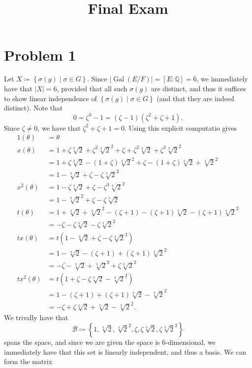 \documentclass[11pt, letterpaper]{article}
\title{Final Exam}
\begin{document}
\makeproblem
\section*{Problem 1}
Let $X\coloneqq \left\{ \sigma (g)\mid \sigma \in G \right\} $. Since $\left| \operatorname{Gal} (E/F) \right| =\left[ E:\mathbb{Q}  \right]=6 $, we immediately have that $\left| X  \right| = 6$, provided that all such $\sigma (g)$ are distinct, and thus it suffices to show linear independence of $\left\{ \sigma (g)\mid \sigma \in G \right\} $ (and that they are indeed distinct). Note that
\[
	0=\zeta ^3-1=(\zeta -1)(\zeta ^2+\zeta +1)
.\]
Since $\zeta \neq 0$, we have that $\zeta ^2+\zeta +1=0$. Using this explicit computatio gives
\begin{align*}
	1(\theta )&=\theta \\
	x(\theta )&=1+\zeta \sqrt[3]{2} +\zeta ^2\sqrt[3]{2}^2 +\zeta +\zeta ^2\sqrt[3]{2} +\zeta ^3\sqrt[3]{2} ^2\\
		  &=1+\zeta \sqrt[3]{2} -(1+\zeta )\sqrt[3]{2}^2 +\zeta -(1+\zeta )\sqrt[3]{2} +\sqrt[3]{2} ^2\\
		  &=1-\sqrt[3]{2} +\zeta -\zeta \sqrt[3]{2} ^2\\
	x^2(\theta )&=1-\zeta \sqrt[3]{2} +\zeta -\zeta ^3\sqrt[3]{2}^2 \\
		    &=1-\sqrt[3]{2}^2 +\zeta -\zeta \sqrt[3]{2} \\
	t(\theta )&=1+\sqrt[3]{2} +\sqrt[3]{2} ^2-(\zeta +1)-(\zeta +1)\sqrt[3]{2} -(\zeta +1)\sqrt[3]{2} ^2\\
		  &=-\zeta -\zeta \sqrt[3]{2} -\zeta \sqrt[3]{2} ^2\\
	tx(\theta )&=t\left( 1-\sqrt[3]{2} +\zeta -\zeta \sqrt[3]{2} ^2 \right) \\
		   &=1-\sqrt[3]{2} -(\zeta +1)+(\zeta +1)\sqrt[3]{2} ^2\\
		   &=-\zeta -\sqrt[3]{2}+\sqrt[3]{2} ^2+\zeta \sqrt[3]{2} ^2 \\
	tx^2(\theta )&=t\left( 1+\zeta -\zeta \sqrt[3]{2} -\sqrt[3]{2} ^2 \right) \\
		     &=1-(\zeta +1)+(\zeta +1)\sqrt[3]{2} -\sqrt[3]{2} ^2\\
		     &=-\zeta +\zeta \sqrt[3]{2} +\sqrt[3]{2} -\sqrt[3]{2} ^2
.\end{align*}
We trivally have that
\[
	\mathcal{B} \coloneqq \left\{ 1,\sqrt[3]{2} ,\sqrt[3]{2} ^2,\zeta ,\zeta \sqrt[3]{2} ,\zeta \sqrt[3]{2} ^2 \right\} 
\]
spans the space, and since we are given the space is 6-dimensional, we immediately have that this set is linearly independent, and thus a basis. We can form the matrix
\end{document}
